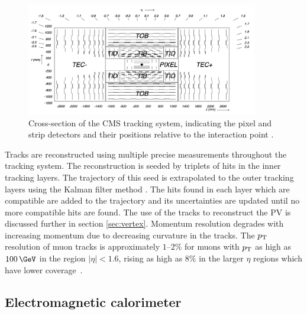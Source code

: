 \begin{figure}[htbp]
   \includegraphics[width=0.9\textwidth]{plots/detector/tracker_layout.png}
\caption[Cross-section of the CMS tracking system, indicating the pixel and
strip detectors and their positions relative to the interaction point.]
{Cross-section of the CMS tracking system, indicating the pixel and
strip detectors and their positions relative to the interaction point \cite{Chatrchyan:2008aa}.}
\label{fig:trackerlayout}
\end{figure}

Tracks are reconstructed using multiple precise measurements throughout the
tracking system. The reconstruction is seeded by triplets of hits in the inner
tracking layers. The trajectory of this seed is extrapolated to the outer tracking
layers using the Kalman filter method \cite{Fruhwirth:1987fm}. The hits found in each layer
which are compatible are added to the trajectory and its uncertainties are
updated until no more compatible hits are found. The use of the tracks to
reconstruct the \ac{PV} is discussed further in section \ref{sec:vertex}.
Momentum resolution degrades with increasing momentum due to decreasing
curvature in the tracks. The $p_{\mathrm{T}}$ resolution of muon tracks is approximately
$1$--$2\%$ for muons with $p_{\mathrm{T}}$ as high as $100\,\GeV$ in the region
$|\eta|<1.6$, rising as high as $8\%$ in the larger $\eta$ regions which have
lower coverage~\cite{Chatrchyan:2008aa}.  

\subsection{Electromagnetic calorimeter}
\label{sec:ecal}

